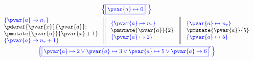 \begin{gather*}
\color{blue} \left\lbrace \boxed{\pvar{a} \mapsto 0}^r \right\rbrace \\
\begin{array}{c || c || c}
\begin{array}{l}
\color{blue} \left\lbrace \pvar{a} \mapsto n_r \right\rbrace \\
\pderef{\pvar{x}}{\pvar{a}}; \\
\pmutate{\pvar{a}}{\pvar{x} + 1} \\
\color{blue} \left\lbrace \pvar{a} \mapsto n_r + 1 \right\rbrace
\end{array}
&
\begin{array}{l}
\color{blue} \left\lbrace \pvar{a} \mapsto n_r \right\rbrace \\
\pmutate{\pvar{a}}{2} \\
\color{blue} \left\lbrace \pvar{a} \mapsto 2 \right\rbrace
\end{array}
&
\begin{array}{l}
\color{blue} \left\lbrace \pvar{a} \mapsto n_r \right\rbrace \\
\pmutate{\pvar{a}}{5} \\
\color{blue} \left\lbrace \pvar{a} \mapsto 5 \right\rbrace
\end{array}
\end{array} \\
\color{blue} \left\lbrace \boxed{\pvar{a} \mapsto 2 \lor \pvar{a} \mapsto 3 \lor \pvar{a} \mapsto 5 \lor \pvar{a} \mapsto 6}^r \right\rbrace
\end{gather*}
\fi